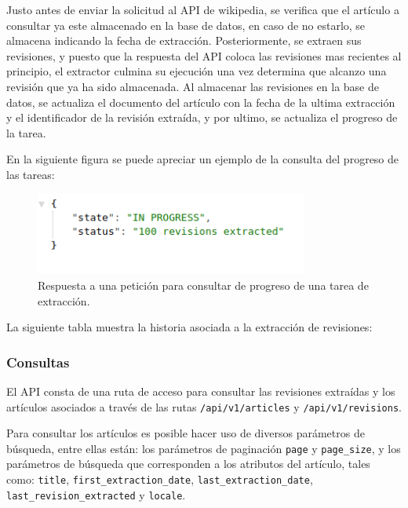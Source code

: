 Justo antes de enviar la solicitud al API de wikipedia, se verifica que el artículo a consultar ya este almacenado en la base de datos, en caso de no estarlo, se almacena indicando la fecha de extracción.
Posteriormente, se extraen sus revisiones, y puesto que la respuesta del API coloca las revisiones mas recientes al principio, el extractor culmina su ejecución una vez determina que alcanzo una revisión que ya ha sido almacenada.
Al almacenar las revisiones en la base de datos, se actualiza el documento del artículo con la fecha de la ultima extracción y el identificador de la revisión extraída, y por ultimo, se actualiza el progreso de la tarea.

En la siguiente figura se puede apreciar un ejemplo de la consulta del progreso de las tareas:

\begin{figure}[H]
	\centering
		\includegraphics[width=0.8\textwidth]{figures/response_status}
	\caption{Respuesta a una petición para consultar de progreso de una tarea de extracción.}
	\label{fig:response_status}
\end{figure}

La siguiente tabla muestra la historia asociada a la extracción de revisiones:



\subsubsection{Consultas}

El API consta de una ruta de acceso para consultar las revisiones extraídas y
los artículos asociados a través de las rutas \texttt{/api/v1/articles} y \texttt{/api/v1/revisions}.

Para consultar los artículos es posible hacer uso de diversos parámetros de búsqueda,
entre ellas están: los parámetros de paginación \texttt{page} y \texttt{page\_size},
y los parámetros de búsqueda que corresponden a los atributos del artículo,
tales como: \texttt{title}, \texttt{first\_extraction\_date}, \texttt{last\_extraction\_date}, \texttt{last\_revision\_extracted} y \texttt{locale}.


